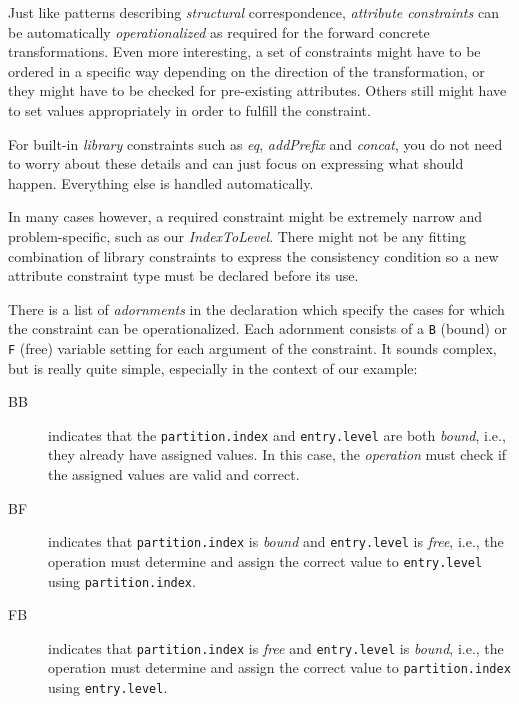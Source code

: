 \newpage

Just like patterns describing \emph{structural} correspondence, \emph{attribute constraints} can be automatically \emph{operationalized} as required for
the forward concrete transformations. Even more interesting, a set of constraints might have to be ordered in a specific way depending on
the direction of the transformation, or they might have to be checked for pre-existing attributes. Others still might have to set values appropriately in
order to fulfill the constraint.

For built-in \emph{library} constraints such as \emph{eq}, \emph{addPrefix} and \emph{concat}, you do not need to worry about these details and can just focus
on expressing what should happen. Everything else is handled automatically.

In many cases however, a required constraint might be extremely narrow and problem-specific, such as our \emph{IndexToLevel}. There might not be any
fitting combination of library constraints to express the consistency condition so a new attribute constraint type must be declared before its use.

There is a list of \emph{adornments} in the declaration which specify the cases for which the constraint can be operationalized. Each adornment consists of a
\texttt{B} (bound) or \texttt{F} (free) variable setting for each argument of the constraint. It sounds complex, but is really quite simple, especially in
the context of our example:

\begin{description}

\item[BB] indicates that the \texttt{partition.index} and \texttt{entry.level} are both \emph{bound}, i.e., they already have assigned values.
In this case, the \emph{operation} must check if the assigned values are valid and correct.

\item[BF] indicates that \texttt{partition.index} is \emph{bound} and \texttt{entry.level} is \emph{free}, i.e., the operation must determine and assign the
correct value to \texttt{entry.level} using \texttt{partition.index}.

\item[FB] indicates that \texttt{partition.index} is \emph{free} and \texttt{entry.level} is \emph{bound}, i.e., the operation must determine and assign the
correct value to \texttt{parti\-tion.in\-dex} using \texttt{entry.level}.

\end{description}


